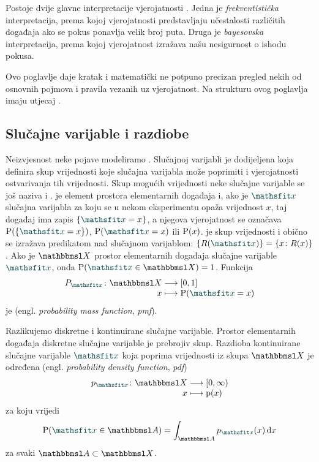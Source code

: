\documentclass[utf8, diplomski, lmodern]{fer}
\begin{document}
Postoje dvije glavne interpretacije vjerojatnosti \citep{Murphy:2012:MLPP}. Jedna je \textit{frekventistička} interpretacija, prema kojoj vjerojatnosti predstavljaju učestalosti različitih događaja ako se pokus ponavlja velik broj puta. Druga je \textit{bayesovska} interpretacija, prema kojoj vjerojatnost izražava našu nesigurnost o ishodu pokusa. 
 
Ovo poglavlje daje kratak i matematički ne potpuno precizan pregled nekih od osnovnih pojmova i pravila vezanih uz vjerojatnost. Na strukturu ovog poglavlja imaju utjecaj \citet{Goodfellow:2016:DL,Murphy:2012:MLPP}.

\subsection{Slučajne varijable i razdiobe}

Neizvjesnost neke pojave modeliramo . Slučajnoj varijabli je dodijeljena  koja definira skup vrijednosti koje slučajna varijabla može poprimiti i vjerojatnosti ostvarivanja tih vrijednosti. Skup mogućih vrijednosti neke slučajne varijable se još naziva i .  je element prostora elementarnih događaja i, ako je $\rvar x$ slučajna varijabla za koju se u nekom eksperimentu opaža vrijednost $x$, taj događaj ima zapis $\cbr{\rvar x = x}$, a njegova vjerojatnost se označava $\P(\cbr{\rvar x = x})$, $\P(\rvar x = x)$ ili $\P(x)$.  je skup vrijednosti i obično se izražava predikatom nad slučajnom varijablom: $\cbr{R(\rvar x)}=\cbr{x\colon R(x)}$. Ako je $\set X$ prostor elementarnih događaja slučajne varijable $\rvar x$, onda $\P(\rvar x\in \set X)=1$. Funkcija 
\begin{align*}
\fullfunction{P_{\rvar x}}{\set X}{\intcc{0,1}}{x}{\P(\rvar x=x)}
\end{align*}
je  (engl. \textit{probability mass function}, \textit{pmf}).

Razlikujemo diskretne i kontinuirane slučajne varijable. Prostor elementarnih događaja diskretne slučajne varijable je prebrojiv skup. Razdioba kontinuirane slučajne varijable $\rvar x$ koja poprima vrijednosti iz skupa $\set X$ je određena  (engl. \textit{probability density function}, \textit{pdf})
\begin{align*}
\fullfunction{p_{\rvar x}}{\set X }{\intco{0,\infty}}{x}{\p(x)}
\end{align*}
za koju vrijedi
\begin{align}
\P(\rvar x\in \set A) = \int_{\set A} p_{\rvar x}(x)\dif x
\end{align}
za svaki $\set A\subset\set X$.
\end{document}
